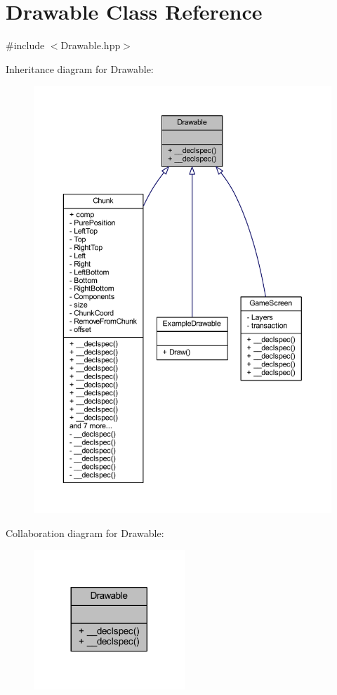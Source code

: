 \hypertarget{class_drawable}{\section{Drawable Class Reference}
\label{class_drawable}
}


{\ttfamily \#include $<$Drawable.\-hpp$>$}



Inheritance diagram for Drawable\-:
\nopagebreak
\begin{figure}[H]
\begin{center}
\leavevmode
\includegraphics[width=350pt]{class_drawable__inherit__graph}
\end{center}
\end{figure}


Collaboration diagram for Drawable\-:\nopagebreak
\begin{figure}[H]
\begin{center}
\leavevmode
\includegraphics[width=161pt]{class_drawable__coll__graph}
\end{center}
\end{figure}

